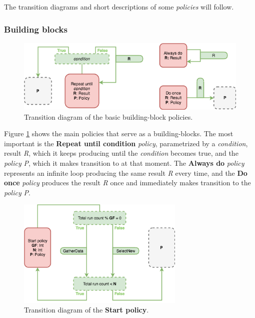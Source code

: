 The transition diagrams and short descriptions of some \textit{policies} will follow.

\subsubsection{Building blocks}

\begin{figure}[h!]
	\captionsetup{justification=centering,margin=0.5cm}
	\centerline{\mbox{\includegraphics[width=130mm]{./img/helper_policies.png}}}
	\caption{Transition diagram of the basic building-block policies.}
	\label{fig:helper_policies}
\end{figure}

Figure \ref{fig:helper_policies} shows the main policies that serve as a building-blocks. The most important is the \textbf{Repeat until condition} \textit{policy}, parametrized by a \textit{condition}, result \textit{R}, which it keeps producing until the \textit{condition} becomes true, and the \textit{policy} \textit{P}, which it makes transition to at that moment. The \textbf{Always do} \textit{policy} represents an infinite loop producing the same result \textit{R} every time, and the \textbf{Do once} \textit{policy} produces the result \textit{R} once and immediately makes transition to the \textit{policy} \textit{P}.

\begin{figure}[h!]
	\captionsetup{justification=centering,margin=0.5cm}
	\centerline{\mbox{\includegraphics[width=80mm]{./img/start_policy.png}}}
	\caption{Transition diagram of the \textbf{Start policy}.}
	\label{fig:start_policy}
\end{figure}

